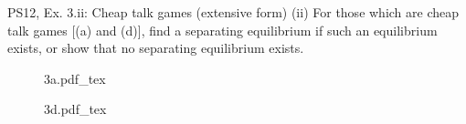 \begin{frame}{PS12, Ex. 3.ii: Cheap talk games (extensive form)}
    (ii) For those which are cheap talk games [(a) and (d)], find a separating equilibrium if such an equilibrium exists, or show that no separating equilibrium exists.\vspace{-6pt}
    \begin{multicols}{2}
      \begin{figure}[!h]
        \center{}
        {3a.pdf_tex}
      \end{figure}
      \vfill\null\columnbreak
      \vfill\null\vspace{85pt}
      \begin{figure}[!h]
        \center{}
        {3d.pdf_tex}
      \end{figure}
    \end{multicols}
\end{frame}

